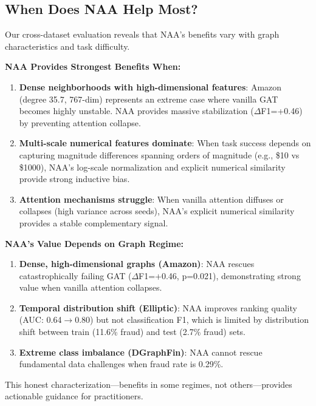 \subsection{When Does NAA Help Most?}
\label{sec:configuration_sensitivity}

Our cross-dataset evaluation reveals that NAA's benefits vary with graph characteristics and task difficulty.

\textbf{NAA Provides Strongest Benefits When:}
\begin{enumerate}
\item \textbf{Dense neighborhoods with high-dimensional features}: Amazon (degree 35.7, 767-dim) represents an extreme case where vanilla GAT becomes highly unstable. NAA provides massive stabilization ($\Delta$F1=+0.46) by preventing attention collapse.

\item \textbf{Multi-scale numerical features dominate}: When task success depends on capturing magnitude differences spanning orders of magnitude (e.g., \$10 vs \$1000), NAA's log-scale normalization and explicit numerical similarity provide strong inductive bias.

\item \textbf{Attention mechanisms struggle}: When vanilla attention diffuses or collapses (high variance across seeds), NAA's explicit numerical similarity provides a stable complementary signal.
\end{enumerate}

\textbf{NAA's Value Depends on Graph Regime:}
\begin{enumerate}
\item \textbf{Dense, high-dimensional graphs (Amazon)}: NAA rescues catastrophically failing GAT ($\Delta$F1=+0.46, p=0.021), demonstrating strong value when vanilla attention collapses.

\item \textbf{Temporal distribution shift (Elliptic)}: NAA improves ranking quality (AUC: 0.64$\to$0.80) but not classification F1, which is limited by distribution shift between train (11.6\% fraud) and test (2.7\% fraud) sets.

\item \textbf{Extreme class imbalance (DGraphFin)}: NAA cannot rescue fundamental data challenges when fraud rate is 0.29\%.
\end{enumerate}

This honest characterization---benefits in some regimes, not others---provides actionable guidance for practitioners.

